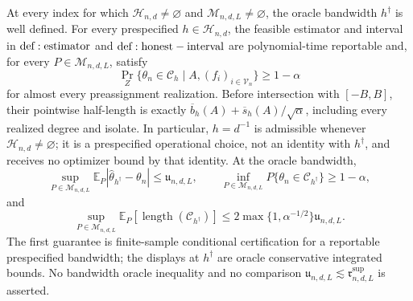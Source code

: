 At every index for which \(\mathcal H_{n,d}\ne\varnothing\) and \(\mathcal M_{n,d,L}\ne\varnothing\), the oracle bandwidth \(h^\dagger\) is well defined.  For every prespecified \(h\in\mathcal H_{n,d}\), the feasible estimator and interval in \({\rm def:estimator}\) and \({\rm def:honest-interval}\) are polynomial-time reportable and, for every \(P\in\mathcal M_{n,d,L}\), satisfy
\[
 \Pr_Z\{\theta_n\in\mathcal C_h\mid A,(f_i)_{i\in\mathcal V_n}\}\geq1-\alpha
\]
for almost every preassignment realization.  Before intersection with \([-B,B]\), their pointwise half-length is exactly \(\overline b_h(A)+\overline s_h(A)/\sqrt\alpha\), including every realized degree and isolate.  In particular, \(h=d^{-1}\) is admissible whenever \(\mathcal H_{n,d}\ne\varnothing\); it is a prespecified operational choice, not an identity with \(h^\dagger\), and receives no optimizer bound by that identity.  At the oracle bandwidth,
\[
 \sup_{P\in\mathcal M_{n,d,L}}\mathbb E_P|\widehat\theta_{h^\dagger}-\theta_n|
 \leq\mathfrak u_{n,d,L},
 \qquad
 \inf_{P\in\mathcal M_{n,d,L}}P\{\theta_n\in\mathcal C_{h^\dagger}\}\geq1-\alpha,
\]
and
\[
 \sup_{P\in\mathcal M_{n,d,L}}
 \mathbb E_P[\operatorname{length}(\mathcal C_{h^\dagger})]
 \leq2\max\{1,\alpha^{-1/2}\}\mathfrak u_{n,d,L}.
\]
The first guarantee is finite-sample conditional certification for a reportable prespecified bandwidth; the displays at \(h^\dagger\) are oracle conservative integrated bounds.  No bandwidth oracle inequality and no comparison \(\mathfrak u_{n,d,L}\lesssim\mathfrak r^{\mathrm{sup}}_{n,d,L}\) is asserted.